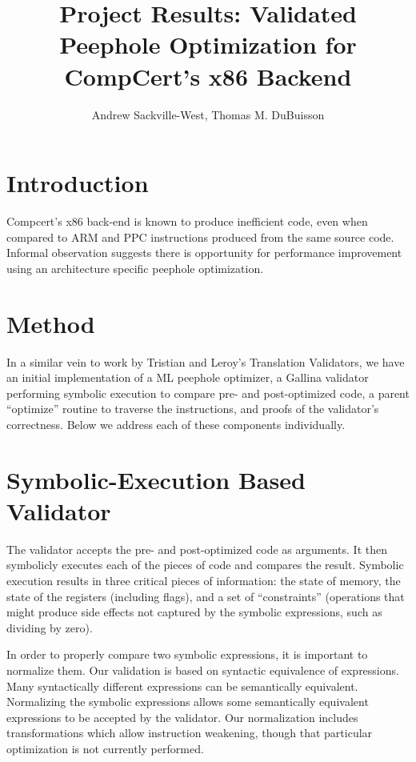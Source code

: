 \documentclass{article}
\title{Project Results: Validated Peephole Optimization for CompCert's x86 Backend}
\author{Andrew Sackville-West, Thomas M. DuBuisson}
\begin{document}
\maketitle

\section{Introduction}

Compcert's x86 back-end is known to produce inefficient code, even
when compared to ARM and PPC instructions produced from the same
source code.  Informal observation suggests there is opportunity for
performance improvement using an architecture specific peephole
optimization.

\section{Method}

In a similar vein to work by Tristian and Leroy's Translation
Validators, we have an initial implementation of a ML peephole
optimizer, a Gallina validator performing symbolic execution to
compare pre- and post-optimized code, a parent ``optimize'' routine to
traverse the instructions, and proofs of the validator's correctness.
Below we address each of these components individually.

\section{Symbolic-Execution Based Validator}

The validator accepts the pre- and post-optimized code as arguments.
It then symbolicly executes each of the pieces of code and compares
the result.  Symbolic execution results in three critical pieces of
information: the state of memory, the state of the registers
(including flags), and a set of ``constraints'' (operations that might
produce side effects not captured by the symbolic expressions, such as
dividing by zero).

In order to properly compare two symbolic expressions, it is important
to normalize them. Our validation is based on syntactic equivalence of
expressions. Many syntactically different expressions can be
semantically equivalent. Normalizing the symbolic expressions allows
some semantically equivalent expressions to be accepted by the
validator. Our normalization includes transformations which allow
instruction weakening, though that particular optimization is not
currently performed.
\end{document}
